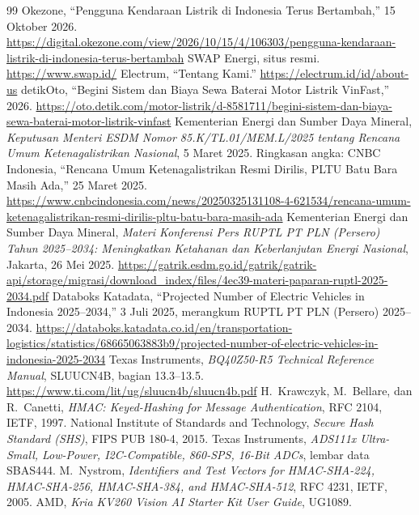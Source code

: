 \documentclass[11pt,a4paper]{article}
\begin{document}
\clearpage
{}
{}
\begin{thebibliography}{99}
   Okezone, ``Pengguna Kendaraan Listrik di Indonesia Terus Bertambah,''
    15 Oktober 2026. \url{https://digital.okezone.com/view/2026/10/15/4/106303/pengguna-kendaraan-listrik-di-indonesia-terus-bertambah}
   SWAP Energi, situs resmi. \url{https://www.swap.id/}
   Electrum, ``Tentang Kami.'' \url{https://electrum.id/id/about-us}
   detikOto, ``Begini Sistem dan Biaya Sewa Baterai Motor Listrik
    VinFast,'' 2026. \url{https://oto.detik.com/motor-listrik/d-8581711/begini-sistem-dan-biaya-sewa-baterai-motor-listrik-vinfast}
   Kementerian Energi dan Sumber Daya Mineral, \textit{Keputusan Menteri ESDM
    Nomor 85.K/TL.01/MEM.L/2025 tentang Rencana Umum Ketenagalistrikan Nasional}, 5 Maret 2025.
    Ringkasan angka: CNBC Indonesia, ``Rencana Umum Ketenagalistrikan Resmi Dirilis, PLTU Batu
    Bara Masih Ada,'' 25 Maret 2025.
    \url{https://www.cnbcindonesia.com/news/20250325131108-4-621534/rencana-umum-ketenagalistrikan-resmi-dirilis-pltu-batu-bara-masih-ada}
   Kementerian Energi dan Sumber Daya Mineral, \textit{Materi Konferensi
    Pers RUPTL PT PLN (Persero) Tahun 2025--2034: Meningkatkan Ketahanan dan Keberlanjutan Energi
    Nasional}, Jakarta, 26 Mei 2025.
    \url{https://gatrik.esdm.go.id/gatrik/gatrik-api/storage/migrasi/download_index/files/4ec39-materi-paparan-ruptl-2025-2034.pdf}
   Databoks Katadata, ``Projected Number of Electric Vehicles in
    Indonesia 2025--2034,'' 3 Juli 2025, merangkum RUPTL PT PLN (Persero) 2025--2034.
    \url{https://databoks.katadata.co.id/en/transportation-logistics/statistics/68665063883b9/projected-number-of-electric-vehicles-in-indonesia-2025-2034}
   Texas Instruments, \textit{BQ40Z50-R5 Technical Reference Manual},
    SLUUCN4B, bagian 13.3--13.5. \url{https://www.ti.com/lit/ug/sluucn4b/sluucn4b.pdf}
   H.~Krawczyk, M.~Bellare, dan R.~Canetti, \textit{HMAC: Keyed-Hashing for
    Message Authentication}, RFC 2104, IETF, 1997.
   National Institute of Standards and Technology, \textit{Secure Hash Standard
    (SHS)}, FIPS PUB 180-4, 2015.
   Texas Instruments, \textit{ADS111x Ultra-Small, Low-Power, I2C-Compatible,
    860-SPS, 16-Bit ADCs}, lembar data SBAS444.
   M.~Nystrom, \textit{Identifiers and Test Vectors for HMAC-SHA-224,
    HMAC-SHA-256, HMAC-SHA-384, and HMAC-SHA-512}, RFC 4231, IETF, 2005.
   AMD, \textit{Kria KV260 Vision AI Starter Kit User Guide}, UG1089.
\end{thebibliography}
\end{document}

